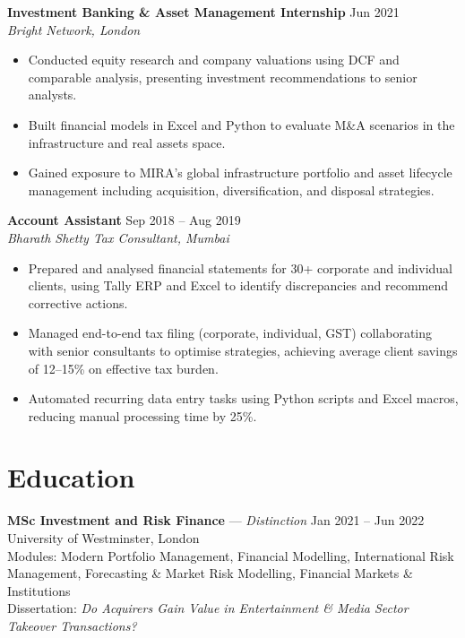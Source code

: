 \documentclass[11pt,a4paper]{article}
\begin{document}
\textbf{Investment Banking \& Asset Management Internship} \hfill Jun 2021 \\
\textit{Bright Network, London}
\begin{itemize}
    \item Conducted equity research and company valuations using DCF and comparable analysis, presenting investment recommendations to senior analysts.
    \item Built financial models in Excel and Python to evaluate M\&A scenarios in the infrastructure and real assets space.
    \item Gained exposure to MIRA's global infrastructure portfolio and asset lifecycle management including acquisition, diversification, and disposal strategies.
\end{itemize}

\textbf{Account Assistant} \hfill Sep 2018 -- Aug 2019 \\
\textit{Bharath Shetty Tax Consultant, Mumbai}
\begin{itemize}
    \item Prepared and analysed financial statements for 30+ corporate and individual clients, using Tally ERP and Excel to identify discrepancies and recommend corrective actions.
    \item Managed end-to-end tax filing (corporate, individual, GST) collaborating with senior consultants to optimise strategies, achieving average client savings of 12--15\% on effective tax burden.
    \item Automated recurring data entry tasks using Python scripts and Excel macros, reducing manual processing time by 25\%.
\end{itemize}

\section{Education}

\textbf{MSc Investment and Risk Finance} --- \textit{Distinction} \hfill Jan 2021 -- Jun 2022 \\
University of Westminster, London \\
{\small Modules: Modern Portfolio Management, Financial Modelling, International Risk Management, Forecasting \& Market Risk Modelling, Financial Markets \& Institutions} \\
{\small Dissertation: \textit{Do Acquirers Gain Value in Entertainment \& Media Sector Takeover Transactions?}}
\end{document}
